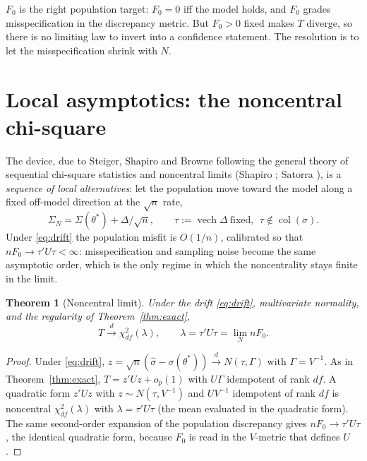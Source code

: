 \documentclass[11pt]{article}
\newcommand{\vech}{\operatorname{vech}}
\newcommand{\dto}{\xrightarrow{d}}
\theoremstyle{plain}
\newtheorem{theorem}{Theorem}
\theoremstyle{remark}
\begin{document}
$F_0$ is the right population target: $F_0=0$ iff the model holds, and $F_0$
grades misspecification in the discrepancy metric. But $F_0>0$ fixed makes $T$
diverge, so there is no limiting law to invert into a confidence statement. The
resolution is to let the misspecification shrink with $N$.

\section{Local asymptotics: the noncentral chi-square}

The device, due to Steiger, Shapiro and Browne \cite{steigershapirobrowne1985}
following the general theory of sequential chi-square statistics and noncentral
limits (Shapiro \cite{shapiro1983}; Satorra \cite{satorra1989}), is a
\emph{sequence of local alternatives}: let the population move toward the model
along a fixed off-model direction at the $\sqrt n$ rate,
\begin{equation}\label{eq:drift}
  \Sigma_N = \Sigma(\theta^\ast) + \Delta/\sqrt n,
  \qquad \tau := \vech\Delta \ \text{fixed},\ \ \tau\not\in\operatorname{col}(\dot\sigma).
\end{equation}
Under \eqref{eq:drift} the population misfit is $O(1/n)$, calibrated so that
$nF_0\to\tau'U\tau<\infty$: misspecification and sampling noise become the same
asymptotic order, which is the only regime in which the noncentrality stays
finite in the limit.

\begin{theorem}[Noncentral limit]\label{thm:ncp}
Under the drift \eqref{eq:drift}, multivariate normality, and the regularity of
Theorem~\ref{thm:exact},
\[
  T \dto \chi^2_{df}(\lambda),
  \qquad
  \lambda = \tau'U\tau = \lim_{N} nF_0 .
\]
\end{theorem}

\begin{proof}
Under \eqref{eq:drift}, $z=\sqrt n(\hat\sigma-\sigma(\theta^\ast))\dto
N(\tau,\Gamma)$ with $\Gamma=V^{-1}$. As in Theorem~\ref{thm:exact},
$T=z'Uz+o_p(1)$ with $U\Gamma$ idempotent of rank $df$. A quadratic form
$z'Uz$ with $z\sim N(\tau,V^{-1})$ and $UV^{-1}$ idempotent of rank $df$ is
noncentral $\chi^2_{df}(\lambda)$ with $\lambda=\tau'U\tau$ (the mean evaluated
in the quadratic form). The same second-order expansion of the population
discrepancy gives $nF_0\to\tau'U\tau$, the identical quadratic form, because
$F_0$ is read in the $V$-metric that defines $U$.
\end{proof}
\end{document}
